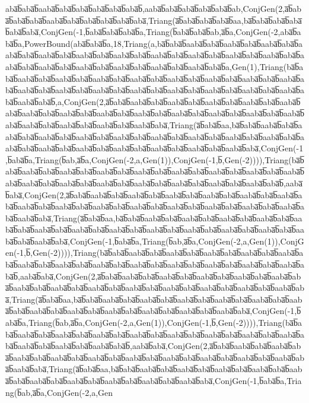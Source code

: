 aba̅b̅aba̅b̅aaba̅b̅aba̅b̅aba̅b̅aba̅b̅aba̅b̅aba̅b̅,aaba̅b̅aba̅b̅aba̅b̅aba̅b̅aba̅b̅ab,ConjGen(2,a̅b̅aba̅b̅aba̅b̅aba̅b̅aaba̅b̅aba̅b̅aba̅b̅aba̅b̅aba̅b̅aba̅,Triang(a̅b̅aba̅b̅aba̅b̅aba̅b̅aa,ba̅b̅aba̅b̅aba̅b̅aba̅b̅aba̅b̅aba̅,ConjGen(-1,b̅aba̅b̅aba̅b̅aba̅b̅a,Triang(b̅aba̅b̅aba̅b̅ab,a̅b̅a,ConjGen(-2,aba̅b̅aba̅b̅a,PowerBound(aba̅b̅aba̅b̅a,18,Triang(a,ba̅b̅aba̅b̅aaba̅b̅aba̅b̅aaba̅b̅aba̅b̅aaba̅b̅aba̅b̅aaba̅b̅aba̅b̅aaba̅b̅aba̅b̅aaba̅b̅aba̅b̅aaba̅b̅aba̅b̅aaba̅b̅aba̅b̅aaba̅b̅aba̅b̅aaba̅b̅aba̅b̅aaba̅b̅aba̅b̅aaba̅b̅aba̅b̅aaba̅b̅aba̅b̅aaba̅b̅aba̅b̅aaba̅b̅aba̅b̅aaba̅b̅aba̅b̅aaba̅b̅aba̅b̅a,Gen(1),Triang(ba̅b̅aba̅b̅aaba̅b̅aba̅b̅aaba̅b̅aba̅b̅aaba̅b̅aba̅b̅aaba̅b̅aba̅b̅aaba̅b̅aba̅b̅aaba̅b̅aba̅b̅aaba̅b̅aba̅b̅aaba̅b̅aba̅b̅aaba̅b̅aba̅b̅aaba̅b̅aba̅b̅aaba̅b̅aba̅b̅aaba̅b̅aba̅b̅aaba̅b̅aba̅b̅aaba̅b̅aba̅b̅aaba̅b̅aba̅b̅aaba̅b̅aba̅b̅aaba̅b̅aba̅b̅,a,ConjGen(2,a̅b̅aba̅b̅aaba̅b̅aba̅b̅aaba̅b̅aba̅b̅aaba̅b̅aba̅b̅aaba̅b̅aba̅b̅aaba̅b̅aba̅b̅aaba̅b̅aba̅b̅aaba̅b̅aba̅b̅aaba̅b̅aba̅b̅aaba̅b̅aba̅b̅aaba̅b̅aba̅b̅aaba̅b̅aba̅b̅aaba̅b̅aba̅b̅aaba̅b̅aba̅b̅aaba̅b̅aba̅b̅aaba̅b̅aba̅b̅aaba̅b̅aba̅b̅aaba̅b̅aba̅,Triang(a̅b̅aba̅b̅aa,ba̅b̅aba̅b̅aaba̅b̅aba̅b̅aaba̅b̅aba̅b̅aaba̅b̅aba̅b̅aaba̅b̅aba̅b̅aaba̅b̅aba̅b̅aaba̅b̅aba̅b̅aaba̅b̅aba̅b̅aaba̅b̅aba̅b̅aaba̅b̅aba̅b̅aaba̅b̅aba̅b̅aaba̅b̅aba̅b̅aaba̅b̅aba̅b̅aaba̅b̅aba̅b̅aaba̅b̅aba̅b̅aaba̅b̅aba̅b̅aaba̅b̅aba̅,ConjGen(-1,b̅aba̅b̅a,Triang(b̅ab,a̅b̅a,ConjGen(-2,a,Gen(1)),ConjGen(-1,b̅,Gen(-2)))),Triang(ba̅b̅aba̅b̅aaba̅b̅aba̅b̅aaba̅b̅aba̅b̅aaba̅b̅aba̅b̅aaba̅b̅aba̅b̅aaba̅b̅aba̅b̅aaba̅b̅aba̅b̅aaba̅b̅aba̅b̅aaba̅b̅aba̅b̅aaba̅b̅aba̅b̅aaba̅b̅aba̅b̅aaba̅b̅aba̅b̅aaba̅b̅aba̅b̅aaba̅b̅aba̅b̅aaba̅b̅aba̅b̅aaba̅b̅aba̅b̅,aaba̅b̅aba̅,ConjGen(2,a̅b̅aba̅b̅aaba̅b̅aba̅b̅aaba̅b̅aba̅b̅aaba̅b̅aba̅b̅aaba̅b̅aba̅b̅aaba̅b̅aba̅b̅aaba̅b̅aba̅b̅aaba̅b̅aba̅b̅aaba̅b̅aba̅b̅aaba̅b̅aba̅b̅aaba̅b̅aba̅b̅aaba̅b̅aba̅b̅aaba̅b̅aba̅b̅aaba̅b̅aba̅b̅aaba̅b̅aba̅b̅aaba̅b̅aba̅,Triang(a̅b̅aba̅b̅aa,ba̅b̅aba̅b̅aaba̅b̅aba̅b̅aaba̅b̅aba̅b̅aaba̅b̅aba̅b̅aaba̅b̅aba̅b̅aaba̅b̅aba̅b̅aaba̅b̅aba̅b̅aaba̅b̅aba̅b̅aaba̅b̅aba̅b̅aaba̅b̅aba̅b̅aaba̅b̅aba̅b̅aaba̅b̅aba̅b̅aaba̅b̅aba̅b̅aaba̅b̅aba̅b̅aaba̅b̅aba̅,ConjGen(-1,b̅aba̅b̅a,Triang(b̅ab,a̅b̅a,ConjGen(-2,a,Gen(1)),ConjGen(-1,b̅,Gen(-2)))),Triang(ba̅b̅aba̅b̅aaba̅b̅aba̅b̅aaba̅b̅aba̅b̅aaba̅b̅aba̅b̅aaba̅b̅aba̅b̅aaba̅b̅aba̅b̅aaba̅b̅aba̅b̅aaba̅b̅aba̅b̅aaba̅b̅aba̅b̅aaba̅b̅aba̅b̅aaba̅b̅aba̅b̅aaba̅b̅aba̅b̅aaba̅b̅aba̅b̅aaba̅b̅aba̅b̅,aaba̅b̅aba̅,ConjGen(2,a̅b̅aba̅b̅aaba̅b̅aba̅b̅aaba̅b̅aba̅b̅aaba̅b̅aba̅b̅aaba̅b̅aba̅b̅aaba̅b̅aba̅b̅aaba̅b̅aba̅b̅aaba̅b̅aba̅b̅aaba̅b̅aba̅b̅aaba̅b̅aba̅b̅aaba̅b̅aba̅b̅aaba̅b̅aba̅b̅aaba̅b̅aba̅b̅aaba̅b̅aba̅,Triang(a̅b̅aba̅b̅aa,ba̅b̅aba̅b̅aaba̅b̅aba̅b̅aaba̅b̅aba̅b̅aaba̅b̅aba̅b̅aaba̅b̅aba̅b̅aaba̅b̅aba̅b̅aaba̅b̅aba̅b̅aaba̅b̅aba̅b̅aaba̅b̅aba̅b̅aaba̅b̅aba̅b̅aaba̅b̅aba̅b̅aaba̅b̅aba̅b̅aaba̅b̅aba̅,ConjGen(-1,b̅aba̅b̅a,Triang(b̅ab,a̅b̅a,ConjGen(-2,a,Gen(1)),ConjGen(-1,b̅,Gen(-2)))),Triang(ba̅b̅aba̅b̅aaba̅b̅aba̅b̅aaba̅b̅aba̅b̅aaba̅b̅aba̅b̅aaba̅b̅aba̅b̅aaba̅b̅aba̅b̅aaba̅b̅aba̅b̅aaba̅b̅aba̅b̅aaba̅b̅aba̅b̅aaba̅b̅aba̅b̅aaba̅b̅aba̅b̅aaba̅b̅aba̅b̅,aaba̅b̅aba̅,ConjGen(2,a̅b̅aba̅b̅aaba̅b̅aba̅b̅aaba̅b̅aba̅b̅aaba̅b̅aba̅b̅aaba̅b̅aba̅b̅aaba̅b̅aba̅b̅aaba̅b̅aba̅b̅aaba̅b̅aba̅b̅aaba̅b̅aba̅b̅aaba̅b̅aba̅b̅aaba̅b̅aba̅b̅aaba̅b̅aba̅,Triang(a̅b̅aba̅b̅aa,ba̅b̅aba̅b̅aaba̅b̅aba̅b̅aaba̅b̅aba̅b̅aaba̅b̅aba̅b̅aaba̅b̅aba̅b̅aaba̅b̅aba̅b̅aaba̅b̅aba̅b̅aaba̅b̅aba̅b̅aaba̅b̅aba̅b̅aaba̅b̅aba̅b̅aaba̅b̅aba̅,ConjGen(-1,b̅aba̅b̅a,Triang(b̅ab,a̅b̅a,ConjGen(-2,a,Gen